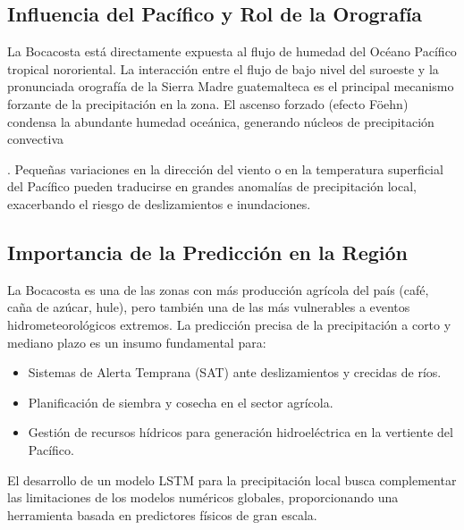 \subsection{Influencia del Pacífico y Rol de la Orografía}
La Bocacosta está directamente expuesta al flujo de humedad del Océano Pacífico tropical nororiental. La interacción entre el flujo de bajo nivel del suroeste y la pronunciada orografía de la Sierra Madre guatemalteca es el principal mecanismo forzante de la precipitación en la zona. El ascenso forzado (efecto Föehn) condensa la abundante humedad oceánica, generando núcleos de precipitación convectiva . Pequeñas variaciones en la dirección del viento o en la temperatura superficial del Pacífico pueden traducirse en grandes anomalías de precipitación local, exacerbando el riesgo de deslizamientos e inundaciones.

\subsection{Importancia de la Predicción en la Región}
La Bocacosta es una de las zonas con más producción agrícola del país (café, caña de azúcar, hule), pero también una de las más vulnerables a eventos hidrometeorológicos extremos. La predicción precisa de la precipitación a corto y mediano plazo es un insumo fundamental para:
\begin{itemize}
    \item Sistemas de Alerta Temprana (SAT) ante deslizamientos y crecidas de ríos.
    \item Planificación de siembra y cosecha en el sector agrícola.
    \item Gestión de recursos hídricos para generación hidroeléctrica en la vertiente del Pacífico.
\end{itemize}
El desarrollo de un modelo LSTM para la precipitación local busca complementar las limitaciones de los modelos numéricos globales, proporcionando una herramienta basada en predictores físicos de gran escala.
